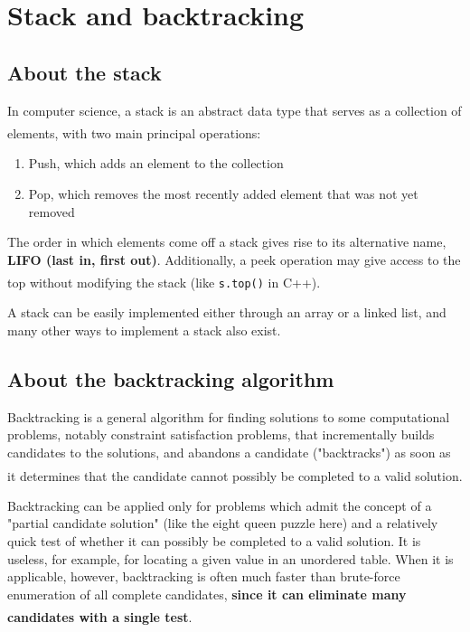 \documentclass[cn,black,12pt,normal]{elegantnote}
\newcommand{\uct}[1]{\textsuperscript{\textsuperscript{\cite{#1}}}}
\begin{document}
\section{Stack and backtracking}

\subsection{About the stack}

In computer science, a stack is an abstract data type that serves as a collection of elements, with two main principal operations\uct{wiki:Stack_(abstract_data_type)}:
\begin{enumerate}
    \item Push, which adds an element to the collection
    \item Pop, which removes the most recently added element that was not yet removed
\end{enumerate}

The order in which elements come off a stack gives rise to its alternative name, \textbf{LIFO (last in, first out)}. Additionally, a peek operation may give access to the top without modifying the stack (like \lstinline{s.top()} in C++).\uct{wiki:Stack_(abstract_data_type)}

A stack can be easily implemented either through an array or a linked list, and many other ways to implement a stack also exist.

\subsection{About the backtracking algorithm}

Backtracking is a general algorithm for finding solutions to some computational problems, notably constraint satisfaction problems, that incrementally builds candidates to the solutions, and abandons a candidate ("backtracks") as soon as it determines that the candidate cannot possibly be completed to a valid solution.\uct{gurari1999cis}

Backtracking can be applied only for problems which admit the concept of a "partial candidate solution" (like the eight queen puzzle here) and a relatively quick test of whether it can possibly be completed to a valid solution. It is useless, for example, for locating a given value in an unordered table. When it is applicable, however, backtracking is often much faster than brute-force enumeration of all complete candidates, \textbf{since it can eliminate many candidates with a single test}.\uct{wiki:Backtracking}
\end{document}
